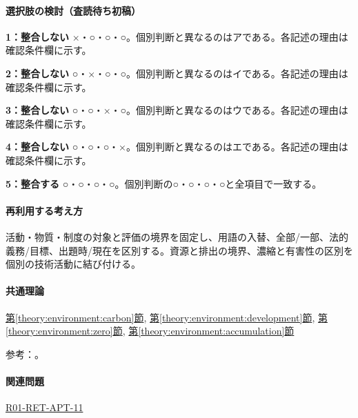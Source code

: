 \paragraph{選択肢の検討（査読待ち初稿）}\mbox{}\par

\noindent\textbf{1：整合しない} ×・○・○・○。個別判断と異なるのはアである。各記述の理由は確認条件欄に示す。\par

\noindent\textbf{2：整合しない} ○・×・○・○。個別判断と異なるのはイである。各記述の理由は確認条件欄に示す。\par

\noindent\textbf{3：整合しない} ○・○・×・○。個別判断と異なるのはウである。各記述の理由は確認条件欄に示す。\par

\noindent\textbf{4：整合しない} ○・○・○・×。個別判断と異なるのはエである。各記述の理由は確認条件欄に示す。\par

\noindent\textbf{5：整合する} ○・○・○・○。個別判断の○・○・○・○と全項目で一致する。\par

\paragraph{再利用する考え方} 活動・物質・制度の対象と評価の境界を固定し、用語の入替、全部/一部、法的義務/目標、出題時/現在を区別する。資源と排出の境界、濃縮と有害性の区別を個別の技術活動に結び付ける。

\paragraph{共通理論} \hyperref[theory:environment:carbon]{第\ref*{theory:environment:carbon}節}, \hyperref[theory:environment:development]{第\ref*{theory:environment:development}節}, \hyperref[theory:environment:zero]{第\ref*{theory:environment:zero}節}, \hyperref[theory:environment:accumulation]{第\ref*{theory:environment:accumulation}節}

\par 参考：\cite{env_offset2008,env_development,env_zero2008,env_accumulation}。

\paragraph{関連問題} \hyperref[q:r01-ret-apt-11]{R01-RET-APT-11}

